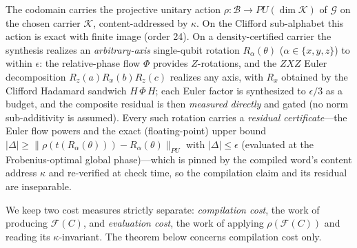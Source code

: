 \begin{definition}
\label{def:semantics}
The codomain carries the projective unitary action $\rho:\mathcal{B}\to PU(\dim\mathcal{K})$ of $\mathcal{G}$ on the chosen carrier $\mathcal{K}$, content-addressed by $\kappa$. On the Clifford sub-alphabet this action is exact with finite image (order 24). On a density-certified carrier the synthesis realizes an \emph{arbitrary-axis} single-qubit rotation $R_\alpha(\theta)$ ($\alpha\in\{x,y,z\}$) to within $\epsilon$: the relative-phase flow $\Phi$ provides $Z$-rotations, and the $ZXZ$ Euler decomposition $R_z(a)R_x(b)R_z(c)$ realizes any axis, with $R_x$ obtained by the Clifford Hadamard sandwich $H\,\Phi\,H$; each Euler factor is synthesized to $\epsilon/3$ as a budget, and the composite residual is then \emph{measured directly} and gated (no norm sub-additivity is assumed). Every such rotation carries a \emph{residual certificate}---the Euler flow powers and the exact (floating-point) upper bound $\lvert\Delta\rvert\ge\lVert\rho(t(R_\alpha(\theta)))-R_\alpha(\theta)\rVert_{PU}$ with $\lvert\Delta\rvert\le\epsilon$ (evaluated at the Frobenius-optimal global phase)---which is pinned by the compiled word's content address $\kappa$ and re-verified at check time, so the compilation claim and its residual are inseparable.
\end{definition}

We keep two cost measures strictly separate: \emph{compilation cost}, the work of producing $\mathcal{F}(C)$, and \emph{evaluation cost}, the work of applying $\rho(\mathcal{F}(C))$ and reading its $\kappa$-invariant. The theorem below concerns compilation cost only.

